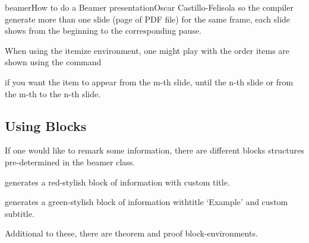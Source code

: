 \begin{article}[2]{beamer}{How to do a Beamer presentation}{Oscar Castillo-Felisola}
  so the compiler generate more than one slide (page of PDF file) for the same frame, each slide shows from the beginning to the corresponding pause.

  When using the itemize environment, one might play with the order items are shown using the command




  if you want the item to appear from the m-th slide, until the n-th slide or from the m-th to the n-th slide.

  \subsection{Using Blocks}

  If one would like to remark some information, there are different blocks structures pre-determined in the beamer class.








  generates a red-stylish block of information with custom title.




  generates a green-stylish block of information withtitle `Example’ and custom subtitle.

  Additional to these, there are theorem and proof block-environments.
\end{article}
